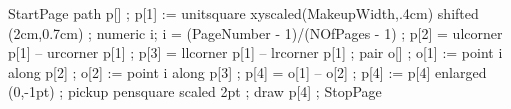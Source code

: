 StartPage
path p[] ;
p[1] := unitsquare xyscaled(MakeupWidth,.4cm) shifted (2cm,0.7cm) ;
numeric i; i = (PageNumber - 1)/(NOfPages - 1) ;
p[2] = ulcorner p[1] -- urcorner p[1] ;
p[3] = llcorner p[1] -- lrcorner p[1] ;
pair o[] ;
o[1] := point i along p[2] ;
o[2] := point i along p[3] ;
p[4] = o[1] -- o[2] ;
p[4] := p[4] enlarged (0,-1pt) ;
pickup pensquare scaled 2pt ;
draw p[4] ;
StopPage
\stopuseMPgraphic







\setupSlideTitle
   [\c!after=,
    \c!alternative=layer,
    \c!width=\textwidth,
    \c!align=\v!center,
    \c!height=1.5cm]


\setupitemize[1][inmargin]

\protect
\stopmodule

\endinput

